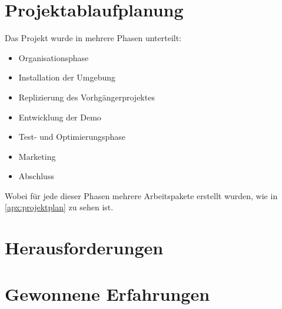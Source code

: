     \section{Projektablaufplanung}

        Das Projekt wurde in mehrere Phasen unterteilt:

        \begin{itemize}
            \item Organisationsphase
            \item Installation der Umgebung
            \item Replizierung des Vorhgängerprojektes
            \item Entwicklung der Demo
            \item Test- und Optimierungsphase
            \item Marketing
            \item Abschluss
        \end{itemize}

        Wobei für jede dieser Phasen mehrere Arbeitspakete erstellt wurden, wie
        in \ref{apx:projektplan} zu sehen ist.

    \section{Herausforderungen}

        \notAvailable{}

    \section{Gewonnene Erfahrungen}

        \notAvailable{}

